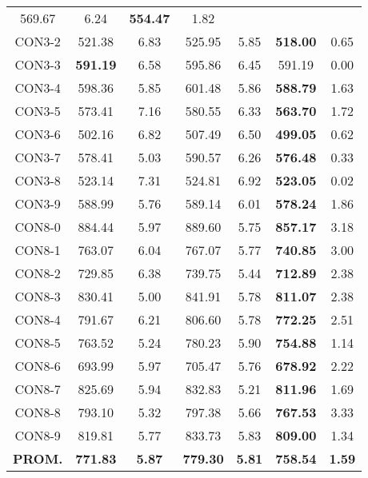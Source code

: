 \begin{table}[ht]
\begin{tabular}{c c c c c c c}
569.67 & 6.24 & \bf{554.47} & 
1.82\\CON3-2 & 521.38 & 6.83 & 
525.95 & 5.85 & \bf{518.00} & 
0.65\\CON3-3 & \bf{591.19} & 6.58 & 
595.86 & 6.45 & 591.19 & 0.00\\
CON3-4 & 598.36 & 5.85 & 
601.48 & 5.86 & \bf{588.79} & 
1.63\\CON3-5 & 573.41 & 7.16 & 
580.55 & 6.33 & \bf{563.70} & 
1.72\\CON3-6 & 502.16 & 6.82 & 
507.49 & 6.50 & \bf{499.05} & 
0.62\\CON3-7 & 578.41 & 5.03 & 
590.57 & 6.26 & \bf{576.48} & 
0.33\\CON3-8 & 523.14 & 7.31 & 
524.81 & 6.92 & \bf{523.05} & 
0.02\\CON3-9 & 588.99 & 5.76 & 
589.14 & 6.01 & \bf{578.24} & 
1.86\\CON8-0 & 884.44 & 5.97 & 
889.60 & 5.75 & \bf{857.17} & 
3.18\\CON8-1 & 763.07 & 6.04 & 
767.07 & 5.77 & \bf{740.85} & 
3.00\\CON8-2 & 729.85 & 6.38 & 
739.75 & 5.44 & \bf{712.89} & 
2.38\\CON8-3 & 830.41 & 5.00 & 
841.91 & 5.78 & \bf{811.07} & 
2.38\\CON8-4 & 791.67 & 6.21 & 
806.60 & 5.78 & \bf{772.25} & 
2.51\\CON8-5 & 763.52 & 5.24 & 
780.23 & 5.90 & \bf{754.88} & 
1.14\\CON8-6 & 693.99 & 5.97 & 
705.47 & 5.76 & \bf{678.92} & 
2.22\\CON8-7 & 825.69 & 5.94 & 
832.83 & 5.21 & \bf{811.96} & 
1.69\\CON8-8 & 793.10 & 5.32 & 
797.38 & 5.66 & \bf{767.53} & 
3.33\\CON8-9 & 819.81 & 5.77 & 
833.73 & 5.83 & \bf{809.00} & 
1.34\\\bf{PROM.} & 
\bf{771.83} & \bf{5.87} & \bf{779.30} & \bf{5.81} & \bf{758.54} & \bf{1.59}\\[1ex]\hline
\end{tabular}
\label{table:nonlin}
\end{table} \clearpage
